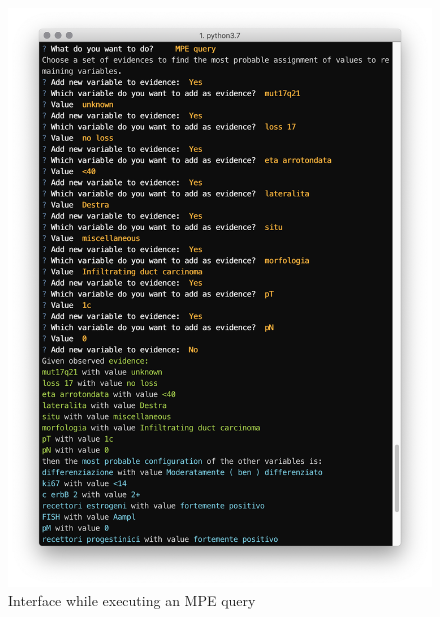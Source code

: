\begin{figure}[htbp]
\centerline{\includegraphics[width=\columnwidth]{methodology/images/nl-mpe-query}}
\caption{Interface while executing an MPE query}
\label{fig:nl-mpe}
\end{figure}
